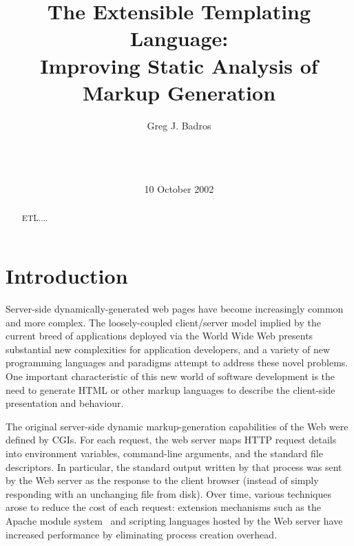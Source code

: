 \documentclass{www2003-submission}
\newcommand{\B}{\discretionary{}{}{}}
\begin{document}
%
\title{The Extensible Templating Language: \\
       Improving Static Analysis of Markup Generation}


\author{
%
\alignauthor Greg J. Badros\\
       \\
       \\
       \\
}
\date{10 October 2002}
\maketitle
\begin{abstract}
ETL....
\end{abstract}




\section{Introduction}

Server-side dynamically-generated web pages have become increasingly
common and more complex.  The loosely-coupled client/\B{}server model
implied by the current breed of applications deployed via the World
Wide Web presents substantial new complexities for application
developers, and a variety of new programming languages and paradigms
attempt to address these novel problems.  One important characteristic
of this new world of software development is the need to generate HTML
or other markup languages to describe the client-side presentation and
behaviour.

The original server-side dynamic markup-generation capabilities of the
Web were defined by CGIs.\cite{CGI} For each request, the web server
maps HTTP request details into environment variables, command-line
arguments, and the standard file descriptors.  In particular, the
standard output written by that process was sent by the Web server as
the response to the client browser (instead of simply responding with
an unchanging file from disk).  Over time, various techniques arose to
reduce the cost of each request: extension mechanisms such as the
Apache module system~\cite{ApacheModules} and scripting languages
hosted by the Web server have increased performance by eliminating
process creation overhead.
\end{document}
